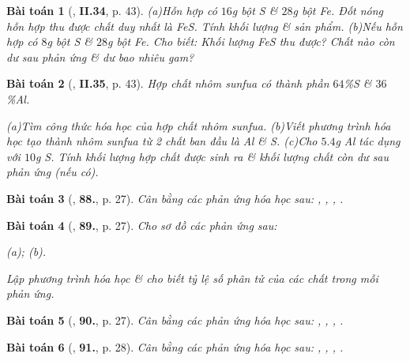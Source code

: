 \documentclass{article}
\numberwithin{equation}{section}
\newtheorem{baitoan}{Bài toán}
\begin{document}
\begin{baitoan}[\cite{Truong_BTNC_Hoa_Hoc_8_2022}, \textbf{II.34}, p. 43]
	
		(a)Hỗn hợp có $16$\emph{g} bột \emph{S} \& $28$\emph{g} bột \emph{Fe}. Đốt nóng hỗn hợp thu được chất duy nhất là \emph{FeS}. Tính khối lượng \& sản phẩm.
		(b)Nếu hỗn hợp có $8$\emph{g} bột \emph{S} \& $28$\emph{g} bột \emph{Fe}. Cho biết: Khối lượng \emph{FeS} thu được? Chất nào còn dư sau phản ứng \& dư bao nhiêu gam?
	
\end{baitoan}

\begin{baitoan}[\cite{Truong_BTNC_Hoa_Hoc_8_2022}, \textbf{II.35}, p. 43]
	Hợp chất nhôm sunfua có thành phần $64$\%\emph{S} \& $36$\%\emph{Al}.
	
		(a)Tìm công thức hóa học của hợp chất nhôm sunfua.
		(b)Viết phương trình hóa học tạo thành nhôm sunfua từ 2 chất ban đầu là \emph{Al} \& \emph{S}.
		(c)Cho $5.4$\emph{g Al} tác dụng với $10$\emph{g S}. Tính khối lượng hợp chất được sinh ra \& khối lượng chất còn dư sau phản ứng (nếu có).
	
\end{baitoan}

\begin{baitoan}[\cite{An2011}, \textbf{88.}, p. 27]
	Cân bằng các phản ứng hóa học sau: \emph{, , , }. 
\end{baitoan}

\begin{baitoan}[\cite{An2011}, \textbf{89.}, p. 27]
	Cho sơ đồ các phản ứng sau:
	
		(a)\emph{};
		(b)\emph{}.
	
	Lập phương trình hóa học \& cho biết tỷ lệ số phân tử của các chất trong mỗi phản ứng.
\end{baitoan}

\begin{baitoan}[\cite{An2011}, \textbf{90.}, p. 27]
	Cân bằng các phản ứng hóa học sau: \emph{, , , }.
\end{baitoan}

\begin{baitoan}[\cite{An2011}, \textbf{91.}, p. 28]
	Cân bằng các phản ứng hóa học sau: \emph{, , , }.
\end{baitoan}
\end{document}
